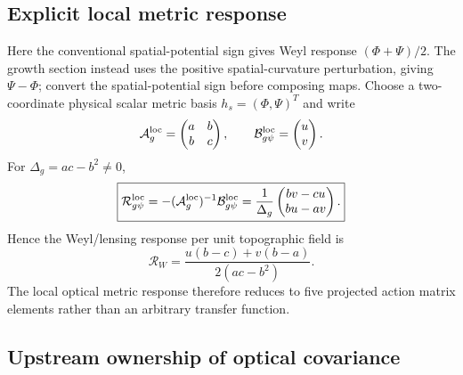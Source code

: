 \subsection{Explicit local metric response}

Here the conventional spatial-potential sign gives Weyl response $(\Phi+\Psi)/2$. The growth section instead uses the positive spatial-curvature perturbation, giving $\Psi-\Phi$; convert the spatial-potential sign before composing maps. Choose a two-coordinate physical scalar metric basis
$h_s=(\Phi,\Psi)^T$ and write
\begin{equation}
\mathcal A_g^{\rm loc}
=
\begin{pmatrix}
a&b\\
b&c
\end{pmatrix},
\qquad
\mathcal B_{g\psi}^{\rm loc}
=
\begin{pmatrix}
u\\v
\end{pmatrix}.
\end{equation}
For $\Delta_g=ac-b^2\ne0$,
\begin{equation}
\boxed{
\mathcal R_{g\psi}^{\rm loc}
=
-
(\mathcal A_g^{\rm loc})^{-1}
\mathcal B_{g\psi}^{\rm loc}
=
\frac1{\Delta_g}
\begin{pmatrix}
bv-cu\\
bu-av
\end{pmatrix}.
}
\label{eq:local-metric-response-explicit}
\end{equation}
Hence the Weyl/lensing response per unit topographic field is
\begin{equation}
\boxed{
\mathcal R_W
=
\frac{u(b-c)+v(b-a)}
{2(ac-b^2)}.
}
\label{eq:local-weyl-response}
\end{equation}
The local optical metric response therefore reduces to five projected action
matrix elements rather than an arbitrary transfer function.

\subsection{Upstream ownership of optical covariance}

